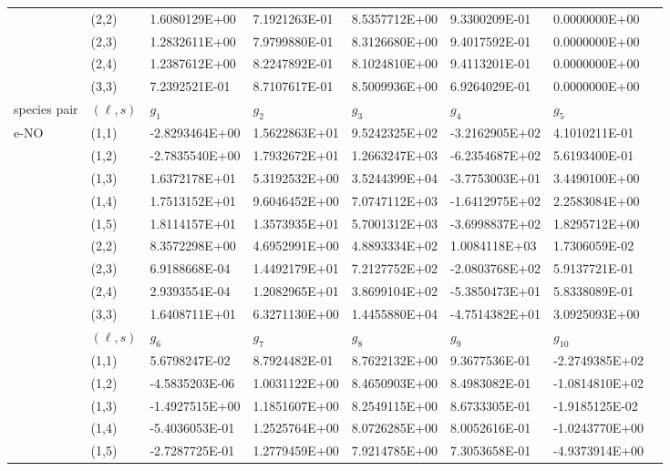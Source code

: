 \documentclass{warpdoc}
\begin{document}
\begin{table}[h]
\begin{center}
\begin{threeparttable}
\begin{tabular*}{\textwidth}{@{\extracolsep{\fill}}llllllll}
&	(2,2)	&	1.6080129E+00	&	7.1921263E-01	&	8.5357712E+00	&	9.3300209E-01	&	0.0000000E+00	\\
&	(2,3)	&	1.2832611E+00	&	7.9799880E-01	&	8.3126680E+00	&	9.4017592E-01	&	0.0000000E+00	\\
&	(2,4)	&	1.2387612E+00	&	8.2247892E-01	&	8.1024810E+00	&	9.4113201E-01	&	0.0000000E+00	\\
&	(3,3)	&	7.2392521E-01	&	8.7107617E-01	&	8.5009936E+00	&	6.9264029E-01	&	0.0000000E+00	\\
      \midrule
species pair & $(\ell,s)$ & $g_1$ & $g_2$ & $g_3$ & $g_4$ & $g_5$ \\
\midrule
\multirow{19}{*}{e-NO} &	(1,1)	&	-2.8293464E+00	&	1.5622863E+01	&	9.5242325E+02	&	-3.2162905E+02	&	4.1010211E-01	\\
&	(1,2)	&	-2.7835540E+00	&	1.7932672E+01	&	1.2663247E+03	&	-6.2354687E+02	&	5.6193400E-01	\\
&	(1,3)	&	1.6372178E+01	&	5.3192532E+00	&	3.5244399E+04	&	-3.7753003E+01	&	3.4490100E+00	\\
&	(1,4)	&	1.7513152E+01	&	9.6046452E+00	&	7.0747112E+03	&	-1.6412975E+02	&	2.2583084E+00	\\
&	(1,5)	&	1.8114157E+01	&	1.3573935E+01	&	5.7001312E+03	&	-3.6998837E+02	&	1.8295712E+00	\\
&	(2,2)	&	8.3572298E+00	&	4.6952991E+00	&	4.8893334E+02	&	1.0084118E+03	&	1.7306059E-02	\\
&	(2,3)	&	6.9188668E-04	&	1.4492179E+01	&	7.2127752E+02	&	-2.0803768E+02	&	5.9137721E-01	\\
&	(2,4)	&	2.9393554E-04	&	1.2082965E+01	&	3.8699104E+02	&	-5.3850473E+01	&	5.8338089E-01	\\
&	(3,3)	&	1.6408711E+01	&	6.3271130E+00	&	1.4455880E+04	&	-4.7514382E+01	&	3.0925093E+00	\\
\cmidrule(lr{1em}){2-7}
 & $(\ell,s)$ & $g_6$ & $g_7$ & $g_8$ & $g_9$ & $g_{10}$ \\
\cmidrule(lr{1em}){2-7}
&	(1,1)	&	5.6798247E-02	&	8.7924482E-01	&	8.7622132E+00	&	9.3677536E-01	&	-2.2749385E+02	\\
&	(1,2)	&	-4.5835203E-06	&	1.0031122E+00	&	8.4650903E+00	&	8.4983082E-01	&	-1.0814810E+02	\\
&	(1,3)	&	-1.4927515E+00	&	1.1851607E+00	&	8.2549115E+00	&	8.6733305E-01	&	-1.9185125E-02	\\
&	(1,4)	&	-5.4036053E-01	&	1.2525764E+00	&	8.0726285E+00	&	8.0052616E-01	&	-1.0243770E+00	\\
&	(1,5)	&	-2.7287725E-01	&	1.2779459E+00	&	7.9214785E+00	&	7.3053658E-01	&	-4.9373914E+00	\\

\end{tabular*}
\end{threeparttable}
\end{center}
\end{table}
\end{document}
